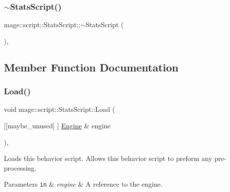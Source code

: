 \mbox{\label{classmage_1_1script_1_1_stats_script_a5b9b30aa6939968c2aee8cdf11f6486c}} 
\subsubsection{\texorpdfstring{$\sim$\+Stats\+Script()}{~StatsScript()}}
{\footnotesize\ttfamily mage\+::script\+::\+Stats\+Script\+::$\sim$\+Stats\+Script (\begin{DoxyParamCaption}{ }\end{DoxyParamCaption})\hspace{0.3cm}{\ttfamily [virtual]}, {\ttfamily [default]}}



\subsection{Member Function Documentation}
\mbox{\label{classmage_1_1script_1_1_stats_script_a4bfada754da5ca76591c5e7b9b0b1f51}} 
\subsubsection{\texorpdfstring{Load()}{Load()}}
{\footnotesize\ttfamily void mage\+::script\+::\+Stats\+Script\+::\+Load (\begin{DoxyParamCaption}\item[{\mbox{[}\mbox{[}maybe\+\_\+unused\mbox{]} \mbox{]} \mbox{\hyperlink{classmage_1_1_engine}{Engine}} \&}]{engine }\end{DoxyParamCaption})\hspace{0.3cm}{\ttfamily [override]}, {\ttfamily [virtual]}}

Loads this behavior script. Allows this behavior script to preform any pre-\/processing.


\begin{DoxyParams}[1]{Parameters}
\mbox{\tt in}  & {\em engine} & A reference to the engine. \\
\hline
\end{DoxyParams}

